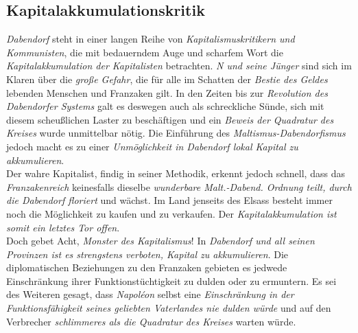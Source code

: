 \subsection{{Kapitalakkumulationskritik}}
\textit{Dabendorf} steht in einer langen Reihe von \textit{Kapitalismuskritikern und Kommunisten}, die mit bedauerndem Auge und scharfem Wort die \textit{Kapitalakkumulation der Kapitalisten} betrachten. \textit{N und seine Jünger} sind sich im Klaren über die \textit{große Gefahr}, die für alle im Schatten der \textit{Bestie des Geldes} lebenden Menschen und Franzaken gilt. In den Zeiten bis zur \textit{Revolution des Dabendorfer Systems} galt es deswegen auch als schreckliche Sünde, sich mit diesem scheußlichen Laster zu beschäftigen und ein \textit{Beweis der Quadratur des Kreises} wurde unmittelbar nötig. Die Einführung des \textit{Maltismus-Dabendorfismus} jedoch macht es zu einer \textit{Unmöglichkeit in Dabendorf lokal Kapital zu akkumulieren}.\\
Der wahre Kapitalist, findig in seiner Methodik, erkennt jedoch schnell, dass das \textit{Franzakenreich} keinesfalls dieselbe \textit{wunderbare Malt.-Dabend. Ordnung teilt, durch die Dabendorf floriert} und wächst. Im Land jenseits des Elsass besteht immer noch die Möglichkeit zu kaufen und zu verkaufen. Der \textit{Kapitalakkumulation ist somit ein letztes Tor offen}.\\
Doch gebet Acht, \textit{Monster des Kapitalismus}! In \textit{Dabendorf und all seinen Provinzen ist es strengstens verboten, Kapital zu akkumulieren}. Die diplomatischen Beziehungen zu den Franzaken gebieten es jedwede Einschränkung ihrer Funktionstüchtigkeit zu dulden oder zu ermuntern. Es sei des Weiteren gesagt, dass \textit{Napoléon} selbst eine \textit{Einschränkung in der Funktionsfähigkeit seines geliebten Vaterlandes nie dulden würde} und auf den Verbrecher \textit{schlimmeres als die Quadratur des Kreises} warten würde.